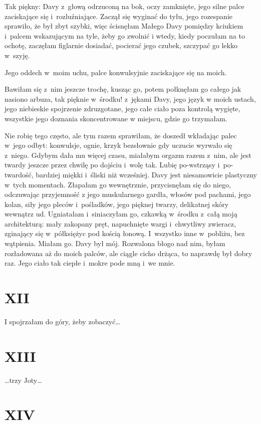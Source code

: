 \documentclass[oneside,polish,12pt,sfheadings]{mwbk}
\begin{document}
Tak piękny: Davy z~głową odrzuconą na bok, oczy zamknięte, jego silne
palce zaciskające się i~rozluźniające. Zaczął się wyginać do tyłu,
jego rozespanie sprawiło, że był zbyt szybki, więc ścisnęłam Małego
Davy pomiędzy kciukiem i~palcem wskazującym na tyle, żeby go zwolnić
i wtedy, kiedy poczułam na to ochotę, zaczęłam figlarnie dosiadać,
pocierać jego czubek, szczypać go lekko w~szyję.

Jego oddech w~moim uchu, palce konwulsyjnie zaciskające się na moich.

Bawiłam się z~nim jeszcze trochę, kusząc go, potem połknęłam go całego
jak nasiono arbuza, tak pięknie w~środku! z~jękami Davy, jego język
w moich ustach, jego niebieskie spojrzenie zdruzgotane, jego całe
ciało poza kontrolą wygięte, wszystkie jego doznania skoncentrowane
w miejscu, gdzie go trzymałam.

Nie robię tego często, ale tym razem sprawiłam, że doszedł wkładając
palec w~jego odbyt: konwulsje, ognie, krzyk bezsłownie gdy uczucie
wyrwało się z~niego. Gdybym dała mu więcej czasu, miałabym orgazm
razem z~nim, ale jest twardy jeszcze przez chwilę po dojściu i~wolę
tak. Lubię po-wstrząsy i~po-twardość, bardziej miękki i~śliski niż
wcześniej. Davy jest niesamowicie plastyczny w~tych momentach. Złapałam
go wewnętrznie, przycisnęłam się do niego, odczuwając przyjemność
z jego muskularnego gardła, włosów pod pachami, jego kolan, siły jego
pleców i~pośladków, jego pięknej twarzy, delikatnej skóry wewnątrz
ud. Ugniatałam i~siniaczyłam go, czkawką w~środku z~całą moją architekturą:
mały zakopany pręt, napuchnięte wargi i~chwytliwy zwieracz, zginający
się w~półksiężyc pod kością łonową. I~wszystko inne w~pobliżu, bez
wątpienia. Miałam go. Davy był mój. Rozwalona błogo nad nim, byłam
rozładowana aż do moich palców, ale ciągle cicho drżąca, to naprawdę
był dobry raz. Jego ciało tak ciepłe i~mokre pode mną i~we mnie.

\chapter{XII}

I spojrzałam do góry, żeby zobaczyć\ldots

\chapter{XIII}

\ldots trzy Joty\ldots 

\chapter{XIV }
\end{document}
